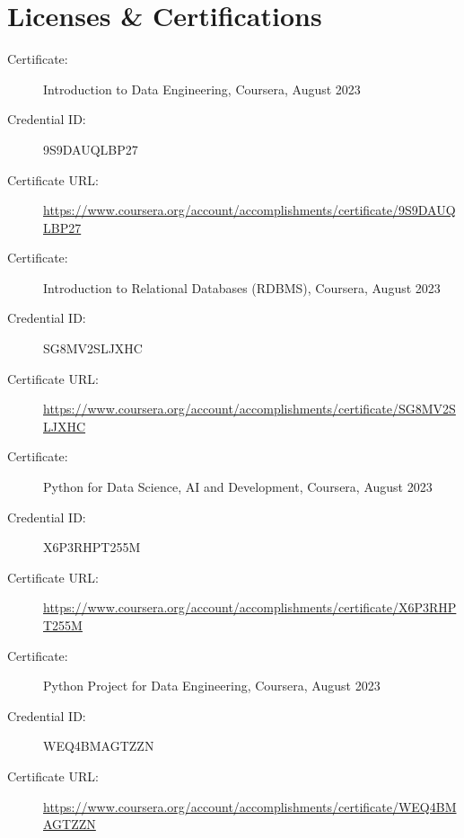 \documentclass[a4paper,10pt]{article}
\begin{document}
\section*{Licenses \& Certifications}
\begin{description}
    \item[Certificate:] Introduction to Data Engineering, Coursera, August 2023
    \item[Credential ID:] 9S9DAUQLBP27
    \item[Certificate URL:] \url{https://www.coursera.org/account/accomplishments/certificate/9S9DAUQLBP27}
\end{description}

\vspace{1pt} %

\begin{description}
    \item[Certificate:] Introduction to Relational Databases (RDBMS), Coursera, August 2023
    \item[Credential ID:] SG8MV2SLJXHC
    \item[Certificate URL:] \url{https://www.coursera.org/account/accomplishments/certificate/SG8MV2SLJXHC}
\end{description}

\vspace{1pt} %

\begin{description}
    \item[Certificate:] Python for Data Science, AI and Development, Coursera, August 2023
    \item[Credential ID:] X6P3RHPT255M
    \item[Certificate URL:] \url{https://www.coursera.org/account/accomplishments/certificate/X6P3RHPT255M}
\end{description}

\vspace{1pt} %

\begin{description}
    \item[Certificate:]  Python Project for Data Engineering, Coursera, August 2023
    \item[Credential ID:]  WEQ4BMAGTZZN
    \item[Certificate URL:] \url{https://www.coursera.org/account/accomplishments/certificate/WEQ4BMAGTZZN}
\end{description}
\end{document}
